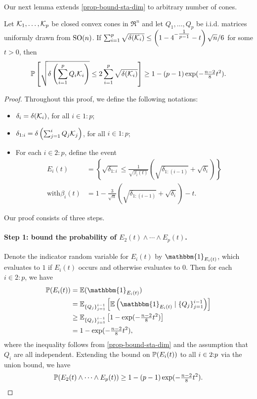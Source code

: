 Our next lemma extends \autoref{prop-bound-sta-dim} to arbitrary number of cones. 
\begin{lemma} \label{prop:bound-sum-sta-dim}
   Let $\mathcal{K}_1, \dots, \mathcal{K}_p$ be closed convex cones in $\Re^n$ and let $Q_1, \dots, Q_p$ be i.i.d. matrices uniformly drawn from $\operatorname{SO}(n)$. If $\sum_{i=1}^p \sqrt{\delta(\mathcal{K}_i)} \leq \left(1 - 4^{- \tfrac{1}{p-1} } - t\right)\sqrt{n} / 6$ for some $t > 0$, then 
   \begin{equation*}
   \mathbb{P}\left[ \sqrt{\delta\left(\sum_{i=1}^pQ_i\mathcal{K}_i\right)} \leq 2\sum_{i=1}^p \sqrt{\delta(\mathcal{K}_i)}\right] \geq 1 - (p-1)\exp(-\tfrac{n-2}{8}t^2).
   \end{equation*}
\end{lemma}

\begin{proof}
    Throughout this proof, we define the following notations:
    \begin{itemize}
      \item $\delta_i = \delta(\mathcal{K}_i)$, for all $i\in1:p$;
      \item $\delta_{1:i} = \delta\left(\sum_{j=1}^iQ_j\mathcal{K}_j\right)$, for all $i\in1:p$;
      \item For each $i\in2:p$, define the event 
    \begin{align*}
      E_i(t) &= \left\{ \sqrt{\delta_{1:i}} \leq \tfrac{1}{\sqrt{\beta_i(t)}} \left( \sqrt{\delta_{1:(i-1)}} + \sqrt{\delta_i}\right)\right\}
      \\\text{with} \beta_i(t) &= 1 - \tfrac{3}{\sqrt{n}}\left( \sqrt{\delta_{1:(i-1)}} + \sqrt{\delta_i}\right) - t.
    \end{align*}
    \end{itemize}
    
    Our proof consists of three steps.
    
    \paragraph{Step 1: bound the probability of $E_2(t)\land\cdots\land E_p(t)$.}
    Denote the indicator random variable for $E_i(t)$ by $\mathbbm{1}_{E_i(t)}$, which evaluates to $1$ if $E_i(t)$ occurs and otherwise evaluates to $0$. Then for each $i\in2:p$, we have
    \begin{align*}
      \mP(E_i(t)) &= \mE(\mathbbm{1}_{E_i(t)})
      \\&= \mE_{\{Q_j\}_{j=1}^{i-1}} \left[ \mE\left(\mathbbm{1}_{E_i(t)} \mid \{Q_j\}_{j=1}^{i-1}\right)\right]
      \\&\geq \mE_{\{Q_j\}_{j=1}^{i-1}} \left[ 1 - \exp(-\tfrac{n-2}{8}t^2) \right]
      \\&= 1 - \exp(-\tfrac{n-2}{8}t^2),
    \end{align*}
    where the inequality follows from \autoref{prop-bound-sta-dim} and the assumption that $Q_i$ are all independent. Extending the bound on $\mathbb{P}(E_i(t))$ to all $i\in2\mathord{:}p$ via the union bound, we have
    \[
      \mathbb{P}(E_2(t) \land\cdots\land E_p(t))
      \geq 1 - (p-1)\exp(-\tfrac{n-2}{8}t^2).\]
    

\end{proof}
